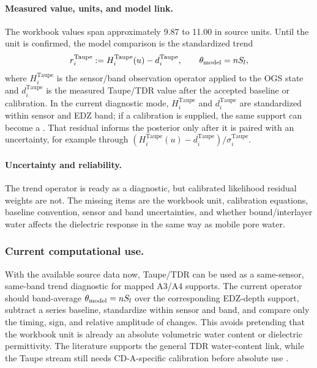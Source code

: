 \paragraph{Measured value, units, and model link.}
The workbook values span approximately 9.87 to 11.00 in source units.  Until the
unit is confirmed, the model comparison is the standardized trend
\[
  r_i^{\mathrm{Taupe}}
  :=
  H_i^{\mathrm{Taupe}}(u)
  -
  d_i^{\mathrm{Taupe}},
  \qquad
  \theta_{\mathrm{model}}=nS_l ,
\]
where \(H_i^{\mathrm{Taupe}}\) is the sensor/band observation operator applied to
the OGS state and \(d_i^{\mathrm{Taupe}}\) is the measured Taupe/TDR value after the
accepted baseline or calibration.  In the current diagnostic mode,
\(H_i^{\mathrm{Taupe}}\) and \(d_i^{\mathrm{Taupe}}\) are standardized within sensor
and EDZ band; if a calibration is supplied, the same support can become a
.  That residual informs the posterior only
after it is paired with an uncertainty, for example through
\((H_i^{\mathrm{Taupe}}(u)-d_i^{\mathrm{Taupe}})/\sigma_i^{\mathrm{Taupe}}\).

\paragraph{Uncertainty and reliability.}
The trend operator is ready as a diagnostic, but calibrated likelihood residual
weights are not.  The missing items are the workbook unit, calibration equations,
baseline convention, sensor and band uncertainties, and whether bound/interlayer
water affects the dielectric response in the same way as mobile pore water.

\subsubsection*{Current computational use.}
With the available source data now, Taupe/TDR can be used as a same-sensor,
same-band trend diagnostic for mapped A3/A4 supports.  The current operator should
band-average \(\theta_{\mathrm{model}}=nS_l\) over the corresponding EDZ-depth
support, subtract a series baseline, standardize within sensor and band, and compare
only the timing, sign, and relative amplitude of changes.  This avoids pretending
that the workbook unit is already an absolute volumetric water content or dielectric
permittivity.  The literature supports the general TDR water-content link, while
the Taupe stream still needs CD-A-specific calibration before absolute use
\citep[review and Secs.~1--2]{Robinson2003TDRReview}
\citep[Taupe/TDR technical slides]{TaupeTDREmail2026}
\citep[Taupe source workbook and support files]{CDAProvidedMeasurementFiles2025}.

